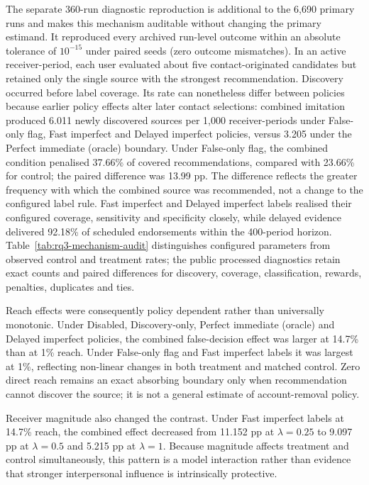 The separate 360-run diagnostic reproduction is additional to the 6,690 primary runs and makes this mechanism auditable without changing the primary estimand. It reproduced every archived run-level outcome within an absolute tolerance of $10^{-15}$ under paired seeds (zero outcome mismatches). In an active receiver-period, each user evaluated about five contact-originated candidates but retained only the single source with the strongest recommendation. Discovery occurred before label coverage. Its rate can nonetheless differ between policies because earlier policy effects alter later contact selections: combined imitation produced 6.011 newly discovered sources per 1,000 receiver-periods under False-only flag, Fast imperfect and Delayed imperfect policies, versus 3.205 under the Perfect immediate (oracle) boundary. Under False-only flag, the combined condition penalised 37.66\% of covered recommendations, compared with 23.66\% for control; the paired difference was 13.99 pp. The difference reflects the greater frequency with which the combined source was recommended, not a change to the configured label rule. Fast imperfect and Delayed imperfect labels realised their configured coverage, sensitivity and specificity closely, while delayed evidence delivered 92.18\% of scheduled endorsements within the 400-period horizon. Table~\ref{tab:rq3-mechanism-audit} distinguishes configured parameters from observed control and treatment rates; the public processed diagnostics retain exact counts and paired differences for discovery, coverage, classification, rewards, penalties, duplicates and ties.

Reach effects were consequently policy dependent rather than universally monotonic. Under Disabled, Discovery-only, Perfect immediate (oracle) and Delayed imperfect policies, the combined false-decision effect was larger at 14.7\% than at 1\% reach. Under False-only flag and Fast imperfect labels it was largest at 1\%, reflecting non-linear changes in both treatment and matched control. Zero direct reach remains an exact absorbing boundary only when recommendation cannot discover the source; it is not a general estimate of account-removal policy.

Receiver magnitude also changed the contrast. Under Fast imperfect labels at 14.7\% reach, the combined effect decreased from 11.152 pp at $\lambda=0.25$ to 9.097 pp at $\lambda=0.5$ and 5.215 pp at $\lambda=1$. Because magnitude affects treatment and control simultaneously, this pattern is a model interaction rather than evidence that stronger interpersonal influence is intrinsically protective.

